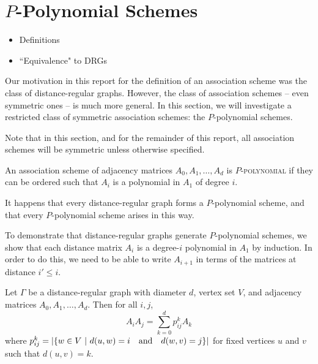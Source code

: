 \documentclass{report}
\begin{document}
      \newpage


  \section{$P$-Polynomial Schemes}\label{sec:AS:PPS}
    \begin{itemize}
      \item Definitions
      \item ``Equivalence" to DRGs
    \end{itemize}

    Our motivation in this report for the definition of an association scheme
    was the class of distance-regular graphs.  However, the class of association
    schemes -- even symmetric ones -- is much more general.  In this section, we
    will investigate a restricted class of symmetric association schemes: the
    $P$-polynomial schemes.

    Note that in this section, and for the remainder of this report, all
    association schemes will be symmetric unless otherwise specified.

    \begin{defn}\label{p-polynomial}
      An association scheme of adjacency matrices $A_0, A_1, \ldots, A_d$ is
      \textsc{$P$-polynomial} if they can be ordered such that $A_i$ is a
      polynomial in $A_1$ of degree $i$.
    \end{defn}

    It happens that every distance-regular graph forms a $P$-polynomial scheme,
    and that every $P$-polynomial scheme arises in this way.

    To demonstrate that distance-regular graphs generate $P$-polynomial schemes,
    we show that each distance matrix $A_i$ is a degree-$i$ polynomial in $A_1$
    by induction.  In order to do this, we need to be able to write $A_{i+1}$ in
    terms of the matrices at distance $i' \leq i$.

    \begin{lem}\label{lem:drg-mult-closed}
      Let $\Gamma$ be a distance-regular graph with diameter $d$, vertex set
      $V$, and adjacency matrices $A_0, A_1, \ldots, A_d$.
      Then for all $i, j$,
      $$
        A_i A_j = \sum_{k=0}^d p_{ij}^k A_k
      $$
      where $p_{ij}^k = \left\lvert \left\lbrace  w \in V \ \middle| \ d(u, w) = i \quad\text{and}\quad d(w, v) = j  \right\rbrace \right\rvert$
      for fixed vertices $u$ and $v$ such that $d(u, v) = k$.
    \end{lem}
\end{document}
